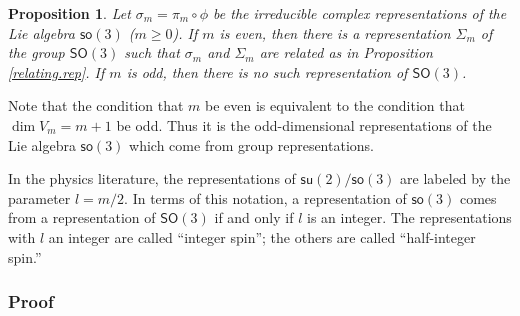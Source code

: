\documentclass{amsbook}
\theoremstyle{plain}
\newtheorem{proposition}[theorem]{Proposition}
\numberwithin{equation}{chapter}
\numberwithin{theorem}{chapter}
\begin{document}
\begin{proposition}
\label{so3.odd}Let $\sigma_{m}=\pi_{m}\circ\phi$ be the irreducible complex
representations of the Lie algebra $\mathsf{so}(3)$ ($m\geq0$). If $m$ is
even, then there is a representation $\Sigma_{m}$ of the group $\mathsf{SO}%
(3)$ such that $\sigma_{m}$ and $\Sigma_{m}$ are related as in Proposition
\ref{relating.rep}. If $m$ is odd, then there is no such representation of
$\mathsf{SO}(3)$.
\end{proposition}

Note that the condition that $m$ be even is equivalent to the condition that
$\dim V_{m}=m+1$ be odd. Thus it is the odd-dimensional representations of the
Lie algebra $\mathsf{so}(3)$ which come from group representations.

In the physics literature, the representations of $\mathsf{su}(2)/\mathsf{so}%
(3)$ are labeled by the parameter $l=m/2$. In terms of this notation, a
representation of $\mathsf{so}(3)$ comes from a representation of
$\mathsf{SO}(3)$ if and only if $l$ is an integer. The representations with
$l$ an integer are called ``integer spin''; the others are called
``half-integer spin.''

\subsubsection{Proof}
\end{document}
